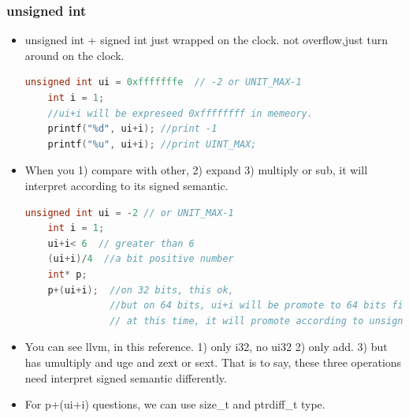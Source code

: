 \documentclass[a4paper,12pt,twoside]{book}
\begin{document}
\subsubsection{unsigned int}
\begin{itemize}
	\item unsigned int + signed int just wrapped on the clock. not overflow,just turn around on the clock. 
	
	\begin{lstlisting}[frame=single, language=c++]
    unsigned int ui = 0xfffffffe  // -2 or UNIT_MAX-1
    int i = 1;
    //ui+i will be expreseed 0xffffffff in memeory. 
    printf("%d", ui+i); //print -1
    printf("%u", ui+i); //print UINT_MAX;
	\end{lstlisting}
	
	\item When you 1) compare with other, 2) expand 3) multiply or sub, it will interpret according to its signed semantic. 
		\begin{lstlisting}[frame=single, language=c++]
	unsigned int ui = -2 // or UNIT_MAX-1
	int i = 1;
	ui+i< 6  // greater than 6
	(ui+i)/4  //a bit positive number
	int* p;
	p+(ui+i);  //on 32 bits, this ok, 
	           //but on 64 bits, ui+i will be promote to 64 bits first.
	           // at this time, it will promote according to unsigned int.
	\end{lstlisting}
	
	\item You can see llvm, in this reference. 1) only i32, no ui32 2) only add.  3) but has umultiply and uge and zext or sext. That is to say, these three operations need interpret signed semantic differently. 
	
	\item For p+(ui+i) questions, we can use size\_t and ptrdiff\_t type. 
\end{itemize}
\end{document}
